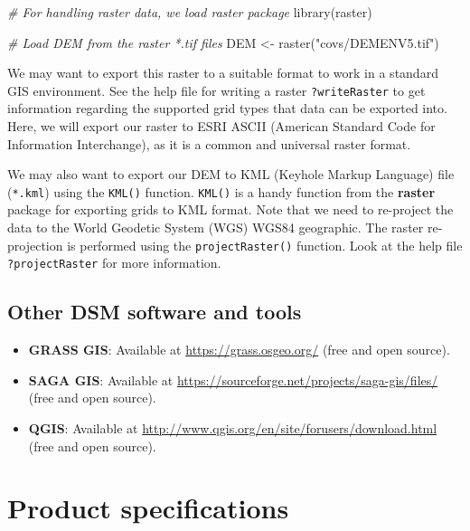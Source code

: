 \documentclass[
  10pt,
  b5paper,
  oneside]{book}
\newenvironment{Shaded}{\begin{snugshade}}{\end{snugshade}}
\newcommand{\CommentTok}[1]{\textcolor[rgb]{0.56,0.35,0.01}{\textit{#1}}}
\newcommand{\FunctionTok}[1]{\textcolor[rgb]{0.00,0.00,0.00}{#1}}
\newcommand{\NormalTok}[1]{#1}
\newcommand{\OtherTok}[1]{\textcolor[rgb]{0.56,0.35,0.01}{#1}}
\newcommand{\StringTok}[1]{\textcolor[rgb]{0.31,0.60,0.02}{#1}}
\providecommand{\tightlist}{%
  \setlength{\itemsep}{0pt}\setlength{\parskip}{0pt}}
\theoremstyle{definition}
\theoremstyle{definition}
\theoremstyle{definition}
\theoremstyle{definition}
\theoremstyle{remark}
\begin{document}
\begin{Shaded}
\begin{Highlighting}[]
\CommentTok{\# For handling raster data, we load raster package}
\FunctionTok{library}\NormalTok{(raster)}

\CommentTok{\# Load DEM from the raster *.tif files}
\NormalTok{DEM }\OtherTok{\textless{}{-}} \FunctionTok{raster}\NormalTok{(}\StringTok{"covs/DEMENV5.tif"}\NormalTok{)}
\end{Highlighting}
\end{Shaded}

We may want to export this raster to a suitable format to work in a standard GIS environment. See the help file for writing a raster \texttt{?writeRaster} to get information regarding the supported grid types that data can be exported into. Here, we will export our raster to ESRI ASCII (American Standard Code for Information Interchange), as it is a common and universal raster format.

We may also want to export our DEM to KML (Keyhole Markup Language) file (\texttt{*.kml}) using the \texttt{KML()} function. \texttt{KML()} is a handy function from the \textbf{raster} package for exporting grids to KML format. Note that we need to re-project the data to the World Geodetic System (WGS) WGS84 geographic. The raster re-projection is performed using the \texttt{projectRaster()} function. Look at the help file \texttt{?projectRaster} for more information.

\hypertarget{other-dsm-software-and-tools}{%
\section{Other DSM software and tools}\label{other-dsm-software-and-tools}}

\begin{itemize}
\tightlist
\item
  \textbf{GRASS GIS}: Available at \url{https://grass.osgeo.org/} (free and open source).
\item
  \textbf{SAGA GIS}: Available at \url{https://sourceforge.net/projects/saga-gis/files/} (free and open source).
\item
  \textbf{QGIS}: Available at \url{http://www.qgis.org/en/site/forusers/download.html} (free and open source).
\end{itemize}

\hypertarget{product-specifications}{%
\chapter{Product specifications}\label{product-specifications}}
\end{document}
